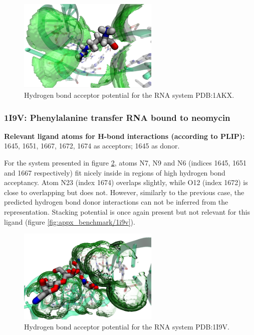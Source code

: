       \begin{figure}[H]
        \centering
        \includegraphics[width=0.6\textwidth]{figures/results/benchmark_rna/1akx.png}
        \caption{\label{fig:benchmark/1akx} Hydrogen bond acceptor potential for the RNA system PDB:1AKX.}
      \end{figure}
    \pagebreak

    \subsubsection{1I9V: Phenylalanine transfer RNA bound to neomycin}
      \textbf{Relevant ligand atoms for H-bond interactions (according to PLIP):} 1645, 1651, 1667, 1672, 1674 as acceptors; 1645 as donor.

      For the system presented in figure \ref{fig:benchmark/1i9v}, atoms N7, N9 and N6 (indices 1645, 1651 and 1667 respectively) fit nicely inside in regions of high hydrogen bond acceptancy. Atom N23 (index 1674) overlaps slightly, while O12 (index 1672) is close to overlapping but does not. However, similarly to the previous case, the predicted hydrogen bond donor interactions can not be inferred from the representation. Stacking potential is once again present but not relevant for this ligand (figure \ref{fig:appx_benchmark/1i9v}).

      \begin{figure}[H]
        \centering
        \includegraphics[width=0.6\textwidth]{figures/results/benchmark_rna/1i9v.png}
        \caption{\label{fig:benchmark/1i9v} Hydrogen bond acceptor potential for the RNA system PDB:1I9V.}
      \end{figure}
    \pagebreak

